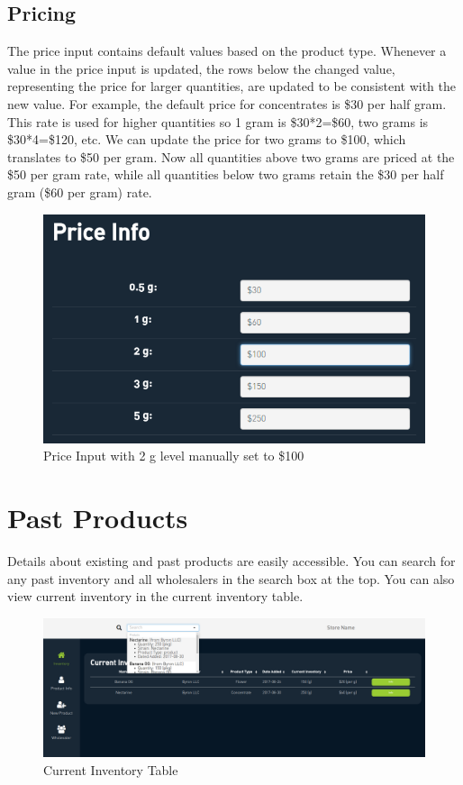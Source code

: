 \documentclass[]{book}
\theoremstyle{definition}
\theoremstyle{definition}
\theoremstyle{definition}
\theoremstyle{remark}
\begin{document}
\subsection{Pricing}\label{pricing}

The price input contains default values based on the product type.
Whenever a value in the price input is updated, the rows below the
changed value, representing the price for larger quantities, are updated
to be consistent with the new value. For example, the default price for
concentrates is \$30 per half gram. This rate is used for higher
quantities so 1 gram is \$30*2=\$60, two grams is \$30*4=\$120, etc. We
can update the price for two grams to \$100, which translates to \$50
per gram. Now all quantities above two grams are priced at the \$50 per
gram rate, while all quantities below two grams retain the \$30 per half
gram (\$60 per gram) rate.

\begin{figure}
\centering
\includegraphics{images/I3.png}
\caption{Price Input with 2 g level manually set to \$100}
\end{figure}

\section{Past Products}\label{past-products}

Details about existing and past products are easily accessible. You can
search for any past inventory and all wholesalers in the search box at
the top. You can also view current inventory in the current inventory
table.

\begin{figure}
\centering
\includegraphics{images/I4.png}
\caption{Current Inventory Table}
\end{figure}
\end{document}
